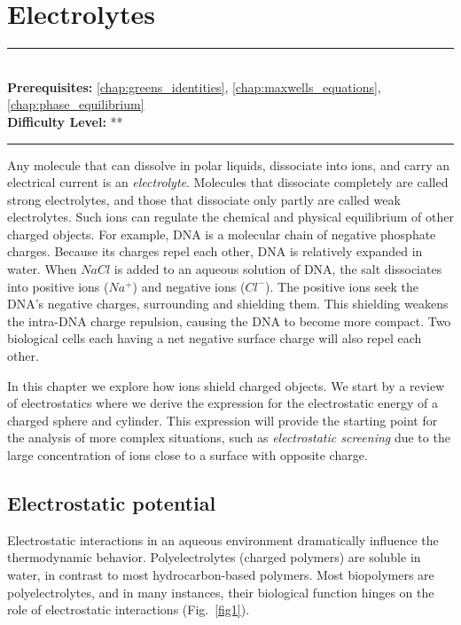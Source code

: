 \documentclass[book.tex]{subfiles}
\begin{document}
\chapter{Electrolytes}
\label{chap:electrolytes}
\noindent\rule{11cm}{0.4pt} \\
\textbf{Prerequisites:} \autoref{chap:greens_identities}, \autoref{chap:maxwells_equations}, \autoref{chap:phase_equilibrium}  \\
\textbf{Difficulty Level:} ** \\
\noindent\rule{11cm}{0.4pt}
\vspace{5mm}

Any molecule that can dissolve in polar liquids, dissociate into ions, and carry an electrical current is an \textit{electrolyte}. Molecules that dissociate completely are called strong electrolytes, and those that dissociate only partly are called weak electrolytes. Such ions can regulate the chemical and physical equilibrium of other charged objects. For example, DNA is a molecular chain of negative phosphate charges. Because its charges repel each other, DNA is relatively expanded in water. When $NaCl$ is added to an aqueous solution of DNA, the salt dissociates into positive ions ($Na^+$) and negative ions ($Cl^-$). The positive ions seek the DNA's negative charges, surrounding and shielding them. This shielding weakens the intra-DNA charge repulsion, causing the DNA to become more compact. Two biological cells each having a net negative surface charge will also repel each other.

In this chapter we explore how ions shield charged objects. We start by a review of electrostatics where we derive the expression for the electrostatic energy of a charged sphere and cylinder. This expression will provide the starting point for the analysis of more complex situations, such as \textit{electrostatic screening} due to the large concentration of ions close to a surface with opposite charge.

\section{Electrostatic potential}

Electrostatic interactions in an aqueous environment dramatically influence the thermodynamic behavior. Polyelectrolytes (charged polymers) are soluble in water, in contrast to most hydrocarbon-based polymers. Most biopolymers are polyelectrolytes, and in many instances, their biological function hinges on the role of electrostatic interactions (Fig.~\ref{fig1}).
\end{document}
